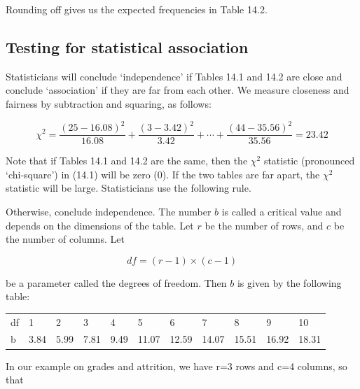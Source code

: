 \documentclass[11pt, chapterprefix=true]{scrbook}\usepackage[]{graphicx}\usepackage[]{color}
\begin{document}
Rounding off gives us the expected frequencies in Table 14.2.

\subsection{Testing for statistical association}

Statisticians will conclude `independence' if Tables 14.1 and 14.2 are close and conclude `association' if they are far from each other.    We measure closeness and fairness by subtraction and squaring, as follows:



\begin{equation*}
\chi^2 = \frac{(25-16.08)^2}{16.08} + \frac{(3-3.42)^2}{3.42} + \cdots + \frac{(44-35.56)^2}{35.56} = 23.42  
\end{equation*}

Note that if Tables 14.1 and 14.2 are the same, then the $\chi^2$ statistic (pronounced `chi-square') in (14.1) will be zero (0).  If the two tables are far apart, the $\chi^2$ statistic will be large.  Statisticians use the following rule. 

\begin{center}
\end{center}

Otherwise, conclude independence.  The number $b$ is called a critical value and depends on the dimensions of the table.  Let $r$ be the number of rows, and $c$ be the number of columns.  Let

\begin{equation*}
df = (r - 1) \times (c - 1)
\end{equation*}

\vspace{1cm}
be a parameter called the degrees of freedom.  Then $b$ is given by the following table:

\begin{table}[ht]
\centering
\begin{tabular}{@{} lllllllllll @{}} \hline
df & 1&2&3&4&5&6&7&8&9&10 \\
b  & 3.84&5.99&7.81&9.49&11.07&12.59&14.07&15.51&16.92&18.31 \\ \hline
\end{tabular}
\end{table}

In our example on grades and attrition, we have r=3 rows and c=4 columns, so that
\end{document}

